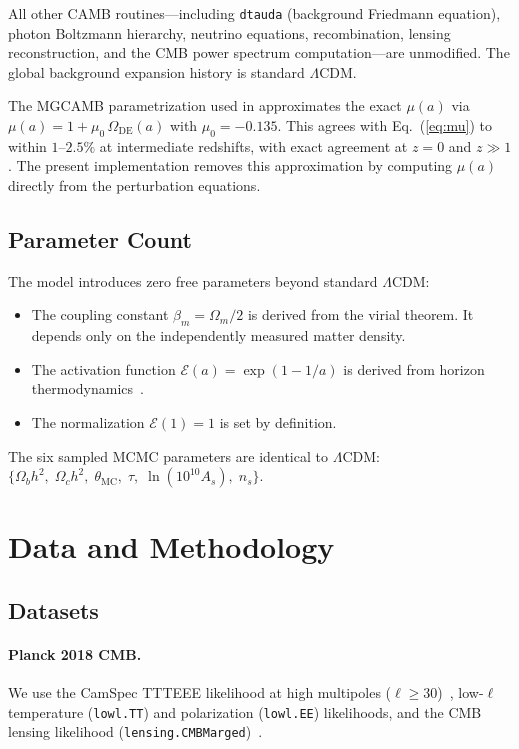 \documentclass[11pt]{article}
\begin{document}
All other CAMB routines---including \texttt{dtauda} (background
Friedmann equation), photon Boltzmann hierarchy, neutrino equations,
recombination, lensing reconstruction, and the CMB power spectrum
computation---are unmodified.  The global background expansion history
is standard $\Lambda$CDM.

The MGCAMB parametrization used in \citet{Mahaffey2026obs} approximates
the exact $\mu(a)$ via $\mu(a) = 1 + \mu_0\,\Omega_\mathrm{DE}(a)$
with $\mu_0 = -0.135$.  This agrees with Eq.~(\ref{eq:mu}) to within
$1$--$2.5\%$ at intermediate redshifts, with exact agreement at
$z = 0$ and $z \gg 1$.  The present implementation removes this
approximation by computing $\mu(a)$ directly from the perturbation
equations.


\subsection{Parameter Count}

The model introduces zero free parameters beyond standard $\Lambda$CDM:
\begin{itemize}
\item The coupling constant $\beta_m = \Omega_m/2$ is derived from the
  virial theorem.  It depends only on the independently measured matter
  density.
\item The activation function $\mathcal{E}(a) = \exp(1 - 1/a)$ is
  derived from horizon thermodynamics~\citep{Mahaffey2026theory}.
\item The normalization $\mathcal{E}(1) = 1$ is set by definition.
\end{itemize}
The six sampled MCMC parameters are identical to $\Lambda$CDM:
$\{\Omega_b h^2,\; \Omega_c h^2,\; \theta_\mathrm{MC},\;
\tau,\; \ln(10^{10} A_s),\; n_s\}$.


\section{Data and Methodology}
\label{sec:data}

\subsection{Datasets}

\paragraph{Planck 2018 CMB.}
We use the CamSpec TTTEEE likelihood at high multipoles
($\ell \geq 30$)~\citep{Efstathiou2021}, low-$\ell$ temperature
(\texttt{lowl.TT}) and polarization (\texttt{lowl.EE}) likelihoods,
and the CMB lensing likelihood
(\texttt{lensing.CMBMarged})~\citep{PlanckCollaboration2020a}.
\end{document}
